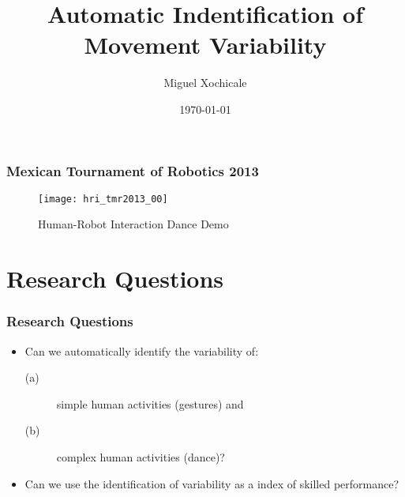 \documentclass{beamer}
\title[Automatic Indentification of Movement Variability]
{Automatic Indentification of \\ Movement Variability}
\author[Miguel Xochicale]
{   %
    Miguel Xochicale
}
\institute[CVC-IIIA]
{   %

      \vspace{5mm}
    \begin{tabular}{c}
    \end{tabular}
}
\date[DEMO-2013]
{   %
     \today
}
\begin{document}
\frame{\titlepage}



% 
% 





 
\begin{frame}
  \frametitle{Mexican Tournament of Robotics 2013}
% 
% 
  \begin{figure}
 \texttt{[image: hri\_tmr2013\_00]}
\centering 
\caption{Human-Robot Interaction Dance Demo}
 \end{figure}
% 
% 
 \end{frame}






\section{Research Questions}

\begin{frame}
	\frametitle{Research Questions}

    \begin{itemize}

    
     \item Can we automatically identify the variability of: \\
      \begin{description}
       \item[(a)] simple human activities (gestures) and
       \item[(b)] complex human activities (dance)?
      \end{description}

      \item 
      Can we use the identification of variability as a
      index of skilled performance?
      
    
     \end{itemize}
    

\end{frame}
\end{document}
